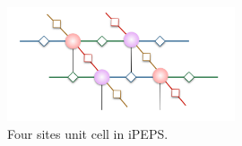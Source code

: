 \begin{figure}[ht]

	\centering
	\includegraphics[width=0.6\textwidth]{figures/fig314.png}
	\caption[The tensor diagrams of 2D lattice]{Four sites unit cell in iPEPS.}
	\label{fig315}
\end{figure}

